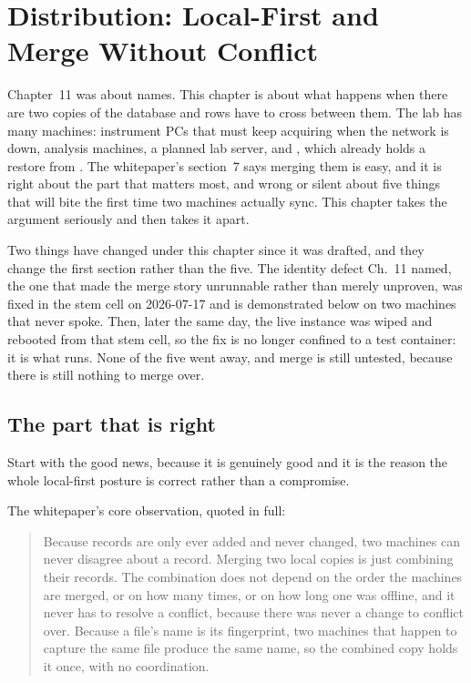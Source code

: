 \chapter{Distribution: Local-First and Merge Without Conflict}

Chapter~11 was about names. This chapter is about what happens when there are two copies of the database and rows have to cross between them. The lab has many machines: instrument PCs that must keep acquiring when the network is down, analysis machines, a planned lab server, and \labScratchMachine, which already holds a restore from \labBackupStore. The whitepaper's section~7 says merging them is easy, and it is right about the part that matters most, and wrong or silent about five things that will bite the first time two machines actually sync. This chapter takes the argument seriously and then takes it apart.

Two things have changed under this chapter since it was drafted, and they change the first section rather than the five. The identity defect Ch.~11 named, the one that made the merge story unrunnable rather than merely unproven, was fixed in the stem cell on 2026-07-17 and is demonstrated below on two machines that never spoke. Then, later the same day, the live instance was wiped and rebooted from that stem cell, so the fix is no longer confined to a test container: it is what runs. None of the five went away, and merge is still untested, because there is still nothing to merge over.

\section{The part that is right}

Start with the good news, because it is genuinely good and it is the reason the whole local-first posture is correct rather than a compromise.

The whitepaper's core observation, quoted in full:

\begin{quote}
Because records are only ever added and never changed, two machines can never disagree about a record. Merging two local copies is just combining their records. The combination does not depend on the order the machines are merged, or on how many times, or on how long one was offline, and it never has to resolve a conflict, because there was never a change to conflict over. Because a file's name is its fingerprint, two machines that happen to capture the same file produce the same name, so the combined copy holds it once, with no coordination.
\end{quote}

